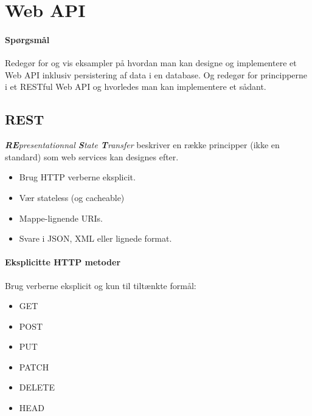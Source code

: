 \section{Web API}

\paragraph{Spørgsmål}
Redegør for og vis eksampler på hvordan man kan designe	og implementere et Web API inklusiv persistering af data i en database.	Og redegør for principperne i et RESTful Web API og	hvorledes man kan implementere et sådant.

\subsection{REST}
\textit{\textbf{RE}presentationnal \textbf{S}tate \textbf{T}ransfer} beskriver en række principper (ikke en standard) som web services kan designes efter. 

\begin{itemize}
	\item Brug HTTP verberne eksplicit.
	\item Vær stateless (og cacheable)
	\item Mappe-lignende URIs.
	\item Svare i JSON, XML eller lignede format.
\end{itemize}

\paragraph{Eksplicitte HTTP metoder}
Brug verberne eksplicit og kun til tiltænkte formål: 

\begin{multicols}{2}
\begin{itemize}
	\item GET
	\item POST
	\item PUT
	\item PATCH
	\item DELETE
	\item HEAD
\end{itemize}
\end{multicols}
